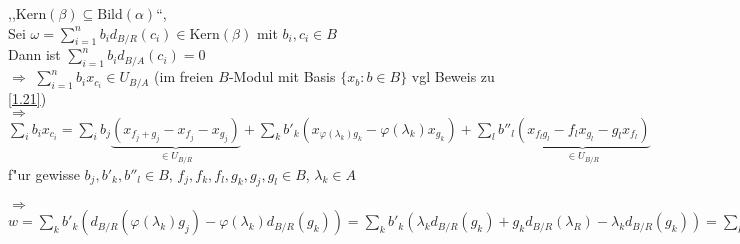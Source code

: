 \begin{Prop}
\begin{enumerate}
\begin{Bew}
,,$\mbox{Kern}(\beta) \subseteq \mbox{Bild}(\alpha)$``,\\
Sei $\omega = \sum_{i=1}^n{b_i} d_{B/R}(c_i) \in \mbox{Kern}(\beta)$ mit $b_i,c_i \in B$\\
Dann ist $\sum_{i=1}^n{b_i d_{B/A}}(c_i) = 0$\\
$\Rightarrow$ $\sum_{i=1}^n{b_i x_{c_i}} \in U_{B/A}$ (im freien $B$-Modul mit Basis $\{ x_b : b \in B \}$ vgl Beweis zu \ref{1.21})\\
$\Rightarrow$ $\sum_i b_i x_{c_i} = \sum_i b_j \underbrace{(x_{f_j + g_j} - x_{f_j} - x_{g_j})}_{\in U_{B/R}} + \sum_k b'_k (x_{\varphi(\lambda_k) g_k} - \varphi(\lambda_k) x_{g_k}) + \sum_l b''_l \underbrace{(x_{f_l g_l} - f_l x_{g_l} - g_l x_{f_l})}_{\in U_{B/R}}$ f"ur gewisse $b_j, b'_k, b''_l \in B$, $f_j,f_k,f_l,g_k,g_j,g_l \in B$, $\lambda_k \in A$

$\Rightarrow$ $w = \sum_k b'_k (d_{B/R}(\varphi(\lambda_k) g_j) - \varphi(\lambda_k) d_{B/R}(g_k)) = \sum_k b'_k (\lambda_k d_{B/R}(g_k) + g_k d_{B/R}(\lambda_R) - \lambda_k d_{B/R}(g_k)) = \sum_k b'_k g_k d_{B/R}(\varphi(\lambda_k)) = \alpha(\sum_k d\lambda_k \otimes b'_l g_l)$
\end{Bew}
\end{enumerate}
\end{Prop}
